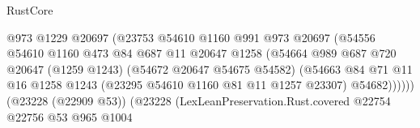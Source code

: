 \begin{lexlean}{RustCore}
\begin{coremodule}
                                                  @973
                                                  @1229
                                                  @20697
                                                  (@23753
                                                    @54610
                                                    @1160
                                                    @991
                                                    @973
                                                    @20697
                                                    (@54556
                                                      @54610
                                                      @1160
                                                      @473
                                                      @84
                                                      @687
                                                      @11
                                                      @20647
                                                      @1258
                                                      (@54664
                                                        @989
                                                        @687
                                                        @720
                                                        @20647
                                                        (@1259 @1243)
                                                        (@54672 @20647 @54675 @54582)
                                                        (@54663
                                                          @84
                                                          @71
                                                          @11
                                                          @16
                                                          @1258
                                                          @1243
                                                          (@23295 @54610 @1160 @81 @11 @1257 @23307)
                                                          @54682))))))
                                              (@23228 (@22909 @53))
                                              (@23228
                                                (LexLeanPreservation.Rust.covered
                                                  @22754
                                                  @22756
                                                  @53
                                                  @965
                                                  @1004

\end{coremodule}
\end{lexlean}
